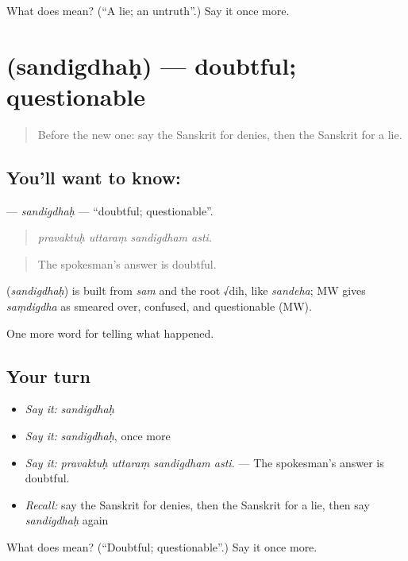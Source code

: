 \begin{tcolorbox}[breakable,colback=teal!4,colframe=teal!35!black,title={Before you move on}]
What does  mean? (\textquotedblleft{}A lie; an untruth\textquotedblright{}.) Say it once more.
\end{tcolorbox}
\section[\texorpdfstring{\sk{सन्दिग्धः} (sandigdhaḥ)}{सन्दिग्धः (sandigdhaḥ)}]{ (sandigdhaḥ) — doubtful; questionable}

\label{lesson:SA-C312-sandigdhah}



\begin{quote}
Before the new one: say the Sanskrit for denies, then the Sanskrit for a lie.
\end{quote}

\subsection*{You'll want to know: }
\textbf{} — \emph{sandigdhaḥ} — \textquotedblleft{}doubtful; questionable\textquotedblright{}.

\begin{quote}
   
\end{quote}

\begin{quote}
\emph{pravaktuḥ uttaraṃ sandigdham asti.}
\end{quote}

\begin{quote}
The spokesman's answer is doubtful.
\end{quote}

\begin{cousinweb}
\textbf{} (\emph{sandigdhaḥ}) is built from \emph{sam} and the root √dih, like \emph{sandeha}; MW gives \emph{saṃdigdha} as smeared over, confused, and questionable (MW).
\end{cousinweb}

\begin{grammarlens}[title={What you've built}]
One more word for telling what happened.
\end{grammarlens}

\subsection*{Your turn}
\begin{itemize}
\raggedright
  \item \emph{Say it:} \emph{sandigdhaḥ}
  \item \emph{Say it:} \emph{sandigdhaḥ}, once more
  \item \emph{Say it:} \emph{pravaktuḥ uttaraṃ sandigdham asti.} — The spokesman's answer is doubtful.
  \item \emph{Recall:} say the Sanskrit for denies, then the Sanskrit for a lie, then say \emph{sandigdhaḥ} again
\end{itemize}

\begin{tcolorbox}[breakable,colback=teal!4,colframe=teal!35!black,title={Before you move on}]
What does  mean? (\textquotedblleft{}Doubtful; questionable\textquotedblright{}.) Say it once more.
\end{tcolorbox}
